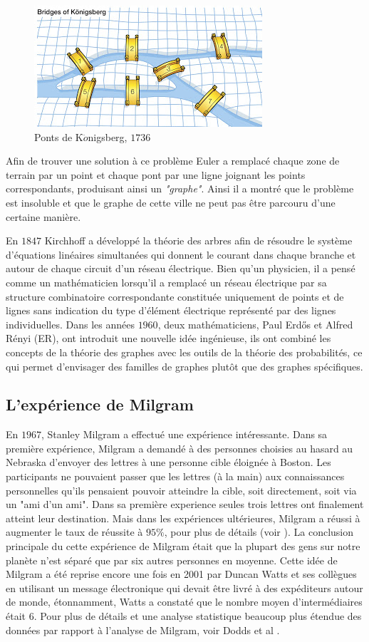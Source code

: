 \begin{figure}[h!]
\centering
\includegraphics[scale=0.7]{./figures/Konig}
\caption{Ponts de K$\ddot{o}$nigsberg, $1736$}
\label{Konig}
\end{figure}
Afin de trouver une solution à ce problème Euler a remplacé chaque zone de terrain par un point et chaque pont par une 
ligne  joignant les points correspondants, produisant ainsi un \textit{"graphe"}. Ainsi il a montré que le problème
est insoluble et que le graphe de cette ville ne peut pas être parcouru d'une certaine manière.

En $1847$ Kirchhoff a développé la théorie des arbres afin de résoudre le système d'équations linéaires simultanées qui 
donnent le courant dans chaque branche et autour de chaque circuit d'un réseau électrique. Bien qu'un physicien, il a 
pensé comme un mathématicien lorsqu'il a remplacé un réseau électrique par sa structure combinatoire  correspondante 
constituée uniquement de points et de lignes sans indication du type d'élément électrique représenté par des lignes
individuelles. Dans les années $1960$, deux mathématiciens, Paul Erd\H{o}s et Alfred Rényi (ER), ont introduit une 
nouvelle idée ingénieuse, ils ont combiné les concepts de la théorie des graphes avec les outils de la théorie des 
probabilités, ce qui permet d'envisager des familles de graphes plutôt que des graphes spécifiques.

 \subsection{L’expérience de Milgram}
 \label{Milgram} 
En $1967$, Stanley Milgram a effectué une expérience intéressante.  Dans sa première expérience, Milgram a demandé à des
personnes choisies au hasard au Nebraska d'envoyer des lettres à une personne cible éloignée à Boston.
Les participants ne pouvaient passer que les lettres (à la main) aux connaissances personnelles qu'ils pensaient pouvoir 
atteindre la cible, soit directement, soit via un  "ami d'un ami".  Dans sa première experience seules trois lettres ont
finalement atteint leur destination. Mais dans les expériences ultérieures, Milgram a réussi à augmenter
le taux de réussite à $95\%$, pour plus de détails (voir \cite{Mi1967,TM1969}). La conclusion principale du cette
expérience de Milgram était que la plupart des gens sur notre planète n'est séparé que par six autres personnes en moyenne.
Cette idée de Milgram a été reprise encore une fois en 2001 par Duncan Watts et ses collègues en utilisant un message 
électronique qui devait être livré à des expéditeurs autour de monde, étonnamment, Watts a constaté que le nombre moyen 
d'intermédiaires était $6$. Pour plus de détails et une analyse statistique beaucoup plus étendue des données par rapport
à l'analyse de Milgram, voir Dodds et al \cite{D-al2003}.

